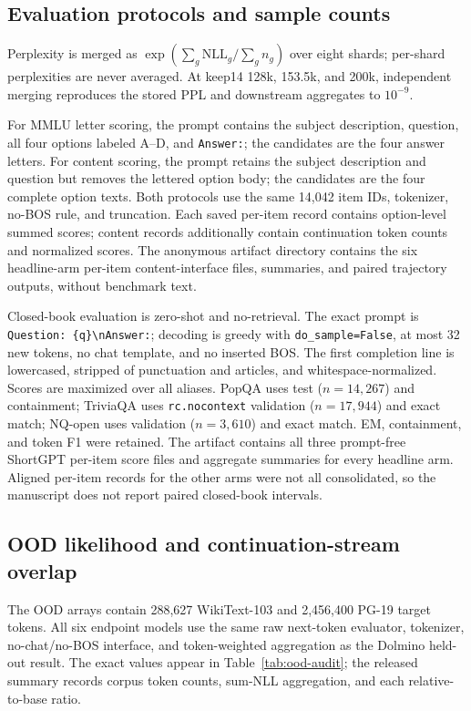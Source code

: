 \subsection{Evaluation protocols and sample counts}


Perplexity is merged as
$\exp(\sum_g\mathrm{NLL}_g/\sum_g n_g)$ over eight shards; per-shard
perplexities are never averaged. At keep14 128k, 153.5k, and 200k, independent
merging reproduces the stored PPL and downstream aggregates to $10^{-9}$.

For MMLU letter scoring, the prompt contains the subject description, question,
all four options labeled A--D, and \texttt{Answer:}; the candidates are the
four answer letters. For content scoring, the prompt retains the subject
description and question but removes the lettered option body; the candidates
are the four complete option texts. Both protocols use the same 14,042 item IDs,
tokenizer, no-BOS rule, and truncation. Each saved per-item record contains
option-level summed scores; content records additionally contain continuation
token counts and normalized scores. The anonymous artifact directory contains
the six headline-arm per-item content-interface files, summaries, and paired
trajectory outputs, without benchmark text.

Closed-book evaluation is zero-shot and no-retrieval. The exact prompt is
\texttt{Question: \{q\}\textbackslash nAnswer:}; decoding is greedy with
\texttt{do\_sample=False}, at most 32 new tokens, no chat template, and no
inserted BOS. The first completion line is lowercased, stripped of punctuation
and articles, and whitespace-normalized. Scores are maximized over all aliases.
PopQA uses test ($n{=}14{,}267$) and containment; TriviaQA uses
\texttt{rc.nocontext} validation ($n{=}17{,}944$) and exact match; NQ-open uses
validation ($n{=}3{,}610$) and exact match. EM, containment, and token F1 were
retained. The artifact contains all three prompt-free ShortGPT per-item score
files and aggregate summaries for every headline arm. Aligned per-item records
for the other arms were not all consolidated, so the manuscript does not report
paired closed-book intervals.

\subsection{OOD likelihood and continuation-stream overlap}
\label{app:ood-contamination}
The OOD arrays contain 288,627 WikiText-103 and 2,456,400 PG-19 target
tokens. All six endpoint models use the same raw next-token evaluator,
tokenizer, no-chat/no-BOS interface, and token-weighted aggregation as the
Dolmino held-out result. The exact values appear in
Table~\ref{tab:ood-audit}; the released summary records corpus token counts,
sum-NLL aggregation, and each relative-to-base ratio.

